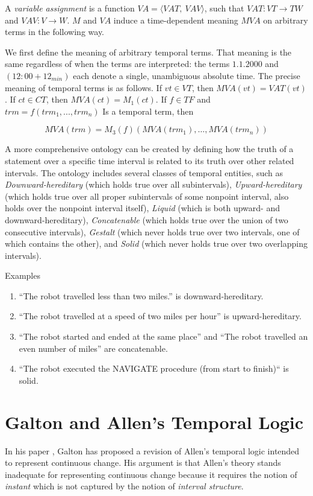 A \textit{variable assignment} is a function $ VA = \langle VAT,\ VAV \rangle$, such that $VAT: VT \to TW$ and
$VAV: V \to W$. $M$ and $VA$ induce a time-dependent meaning $MVA$ on arbitrary terms in the following way.

We first define the meaning of arbitrary temporal terms. That meaning is the same regardless of when the terms are interpreted: the terms $1.1.2000$ and
$(12:00 + 12_{min})$ each denote a single, unambiguous absolute time. The precise
meaning of temporal terms is as follows. If $vt \in VT $, then $MVA (vt) = VAT (vt)$.
If $ct \in CT$, then $MVA (ct) = M_1(ct)$. If $f \in T F$ and $trm = f(trm_1, . . . , trm_n)$ Is a
temporal term, then

\[
	MVA(trm) = M_3(f)(MVA(trm_1), \dots, MVA(trm_n))
\]

A more comprehensive ontology can be created by defining how the truth of a statement over a specific time interval is related to its truth over other related intervals.
The ontology includes several classes of temporal entities, such as \textit{Downward-hereditary} (which holds true over all subintervals), \textit{Upward-hereditary} (which holds true over all proper subintervals of some nonpoint interval, also holds over the nonpoint interval itself),
\textit{Liquid} (which is both upward- and downward-hereditary), \textit{Concatenable} (which holds true over the union of two consecutive intervals),
\textit{Gestalt} (which never holds true over two intervals, one of which contains the other), and \textit{Solid} (which never holds true over two overlapping intervals).

\begin{exmp} Examples
	\begin{enumerate}
		\item  ``The robot travelled less than two miles.'' is downward-hereditary.
		\item  ``The robot travelled at a speed of two miles per hour'' is upward-hereditary.
		\item ``The robot started and ended at the same place'' and ``The robot travelled an even number of miles'' are concatenable.
		\item ``The robot executed the NAVIGATE procedure (from start to finish)`` is solid.
	\end{enumerate}
\end{exmp}


\section{Galton and Allen's Temporal Logic}
In his paper \cite{galton2004}, Galton has proposed a revision of Allen's temporal logic intended to represent continuous change.
His argument is that Allen's theory stands inadequate for representing continuous change because it requires the notion of \textit{instant} which is not captured by the notion of \textit{interval structure}.

